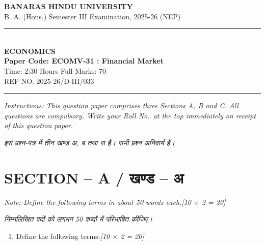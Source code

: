 \documentclass[11pt,a4paper]{article}
\newcommand{\pts}[1]{\hfill \textit{[#1]}}
\begin{document}
\begin{center}
  {\large\bfseries BANARAS HINDU UNIVERSITY}\\[2pt]
  {\normalsize B. A. (Hons.) Semester III Examination, 2025-26 (NEP)}\\[6pt]
  \rule{0.8\linewidth}{0.5pt}\\[6pt]
  {\large\bfseries ECONOMICS}\\[4pt]
  {\large\bfseries Paper Code: ECOMV-31 : Financial Market}\\[4pt]
  {\normalsize Time: 2:30 Hours \hfill Full Marks: 70}\\[2pt]
  {\small REF NO. 2025-26/D-III/033}
\end{center}
\rule{\linewidth}{0.4pt}
\smallskip

\noindent \textit{Instructions: This question paper comprises three Sections A, B and C. All questions are compulsory. Write your Roll No.\ at the top immediately on receipt of this question paper.}

\smallskip
\noindent \textit{इस प्रश्न-पत्र में तीन खण्ड अ, ब तथा स हैं। सभी प्रश्न अनिवार्य हैं।}

\bigskip

\section*{SECTION -- A / खण्ड -- अ}
\noindent \textit{Note: Define the following terms in about 50 words each.}\pts{10 $\times$ 2 = 20}

\noindent \textit{निम्नलिखित पदों को लगभग 50 शब्दों में परिभाषित कीजिए।}

\begin{enumerate}[label=\textbf{\arabic*.},leftmargin=*,itemsep=8pt]
  \item Define the following terms:\pts{10 $\times$ 2 = 20}
\end{enumerate}
\end{document}
